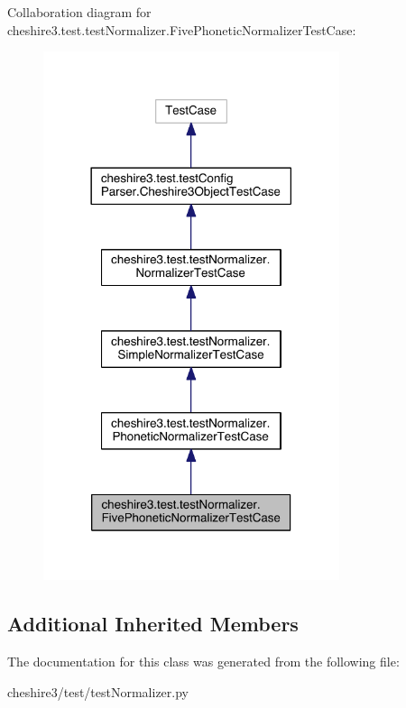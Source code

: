 Collaboration diagram for cheshire3.\-test.\-test\-Normalizer.\-Five\-Phonetic\-Normalizer\-Test\-Case\-:
\nopagebreak
\begin{figure}[H]
\begin{center}
\leavevmode
\includegraphics[width=246pt]{classcheshire3_1_1test_1_1test_normalizer_1_1_five_phonetic_normalizer_test_case__coll__graph}
\end{center}
\end{figure}
\subsection*{Additional Inherited Members}


The documentation for this class was generated from the following file\-:\begin{DoxyCompactItemize}
\item 
cheshire3/test/test\-Normalizer.\-py\end{DoxyCompactItemize}
